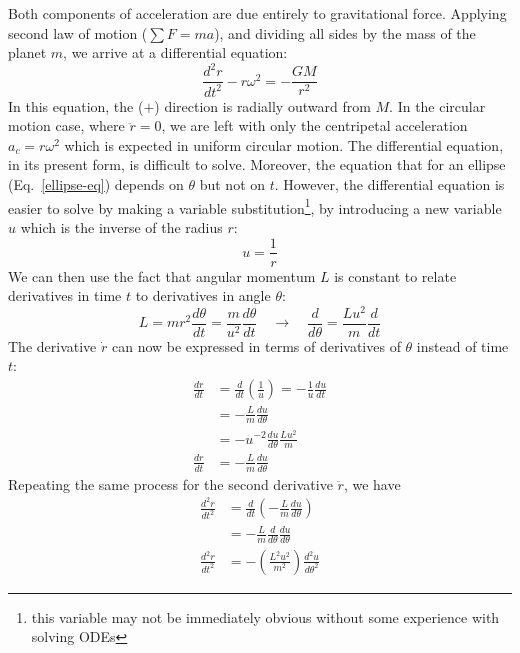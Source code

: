 \documentclass{../../../oss-handout}
\begin{document}
Both components of acceleration are due entirely to gravitational force.
Applying second law of motion ($\sum F=ma$), and dividing all sides by the mass
of the planet $m$, we arrive at a differential equation:
\begin{equation}
  \frac{d^2r}{dt^2}-r\omega^2=-\frac{GM}{r^2}
  \label{ode1}
\end{equation}
In this equation, the ($+$) direction is radially outward from $M$. In the
circular motion case, where $\ddot{r}=0$, we are left with only the centripetal
acceleration
$a_c=r\omega^2$ which is expected in uniform circular motion. The differential
equation, in its present form, is difficult to solve. Moreover, the equation
that for an ellipse (Eq.~\ref{ellipse-eq}) depends on $\theta$ but not on $t$.
However, the
differential equation is easier to solve by making a variable
substitution\footnote{this variable may not be immediately obvious without
  some experience with solving ODEs}, by introducing a new variable $u$ which
is the inverse of the radius $r$:
\begin{equation}
  u=\frac1r
\end{equation}
We can then use the fact that angular momentum $L$ is constant to relate
derivatives in time $t$ to derivatives in angle $\theta$:
\begin{equation}
  L=mr^2\frac{d\theta}{dt}=\frac{m}{u^2}\frac{d\theta}{dt}
  \quad\longrightarrow\quad
  \frac{d}{d\theta}=\frac{Lu^2}{m}\frac{d}{dt}
\end{equation}
The derivative $\dot{r}$ can now be expressed in terms of derivatives of
$\theta$ instead of time $t$:
\begin{align}
  \nonumber
  \frac{dr}{dt} &=\frac{d}{dt}\left(\frac{1}{u}\right)
  =-\frac{1}{u}\frac{du}{dt}\\
  \nonumber
  &=-\frac{L}{m}\frac{du}{d\theta}\\
  \nonumber
  &= -u^{-2}\frac{du}{d\theta} \frac{Lu^2}{m} \\
  \frac{dr}{dt}&= -\frac{L}{m}\frac{du}{d\theta}
\end{align}
Repeating the same process for the second derivative $\ddot{r}$, we have
\begin{align}
  \nonumber
  \frac{d^2r}{dt^2} &= \frac{d}{dt}\left(-\frac{L}{m}\frac{du}{d\theta}\right)\\
  \nonumber
  &= -\frac{L}{m} \frac{d}{d\theta}\frac{du}{d\theta} \\
  \frac{d^2r}{dt^2}&= -\left(\frac{L^2u^2}{m^2}\right)\frac{d^2u}{d\theta^2}
\end{align}
\end{document}
